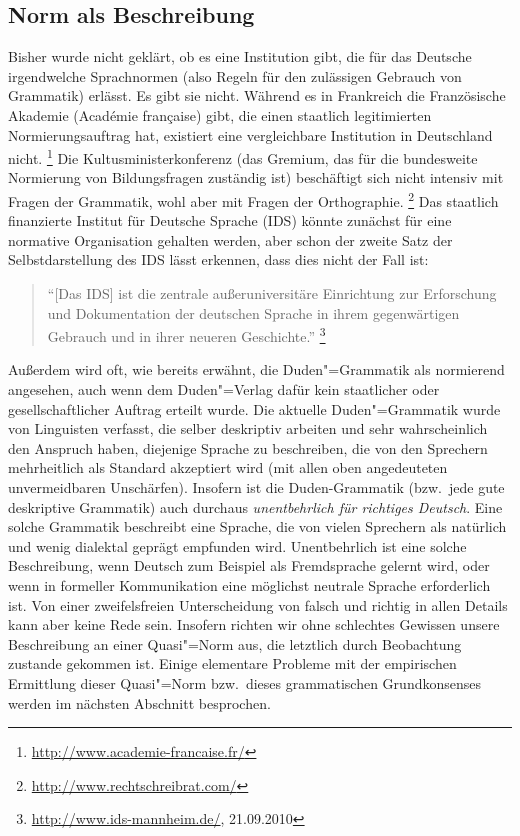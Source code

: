 \subsection{Norm als Beschreibung}

\label{sec:normalsbeschreibung}

Bisher wurde nicht geklärt, ob es eine Institution gibt, die für das Deutsche irgendwelche Sprachnormen (also Regeln für den zulässigen Gebrauch von Grammatik) erlässt.
Es gibt sie nicht.
Während es \zB in Frankreich die Französische Akademie (Académie française) gibt, die einen staatlich legitimierten Normierungsauftrag hat, existiert eine vergleichbare Institution in Deutschland nicht.%
\footnote{\raggedright{\url{http://www.academie-francaise.fr/}}}
Die Kultusministerkonferenz (das Gremium, das für die bundesweite Normierung von Bildungsfragen zuständig ist) beschäftigt sich nicht intensiv mit Fragen der Grammatik, wohl aber mit Fragen der Orthographie.%
\footnote{\url{http://www.rechtschreibrat.com/}}
Das staatlich finanzierte Institut für Deutsche Sprache (IDS) könnte zunächst für eine normative Organisation gehalten werden, aber schon der zweite Satz der Selbstdarstellung des IDS lässt erkennen, dass dies nicht der Fall ist:

\begin{quote}
  "`[Das IDS] ist die zentrale außeruniversitäre Einrichtung zur Erforschung und Dokumentation der deutschen Sprache in ihrem gegenwärtigen Gebrauch und in ihrer neueren Geschichte."'%
    \footnote{\raggedright{\url{http://www.ids-mannheim.de/}, 21.09.2010}}
\end{quote}

Außerdem wird oft, wie bereits erwähnt, die Duden"=Grammatik als normierend angesehen, auch wenn dem Duden"=Verlag dafür kein staatlicher oder gesellschaftlicher Auftrag erteilt wurde.
Die aktuelle Duden"=Grammatik wurde von Linguisten verfasst, die selber deskriptiv arbeiten und sehr wahrscheinlich den Anspruch haben, diejenige Sprache zu beschreiben, die von den Sprechern mehrheitlich als Standard akzeptiert wird (mit allen oben angedeuteten unvermeidbaren Unschärfen).
Insofern ist die Duden-Grammatik (bzw.\ jede gute deskriptive Grammatik) auch durchaus \textit{unentbehrlich für richtiges Deutsch}.
Eine solche Grammatik beschreibt eine Sprache, die von vielen Sprechern als natürlich und wenig dialektal geprägt empfunden wird.
Unentbehrlich ist eine solche Beschreibung, wenn Deutsch zum Beispiel als Fremdsprache gelernt wird, oder wenn in formeller Kommunikation eine möglichst neutrale Sprache erforderlich ist.
Von einer zweifelsfreien Unterscheidung von falsch und richtig in allen Details kann aber keine Rede sein.
Insofern richten wir ohne schlechtes Gewissen unsere Beschreibung an einer Quasi"=Norm aus, die letztlich durch Beobachtung zustande gekommen ist.
Einige elementare Probleme mit der empirischen Ermittlung dieser Quasi"=Norm bzw.\ dieses grammatischen Grundkonsenses werden im nächsten Abschnitt besprochen. 


